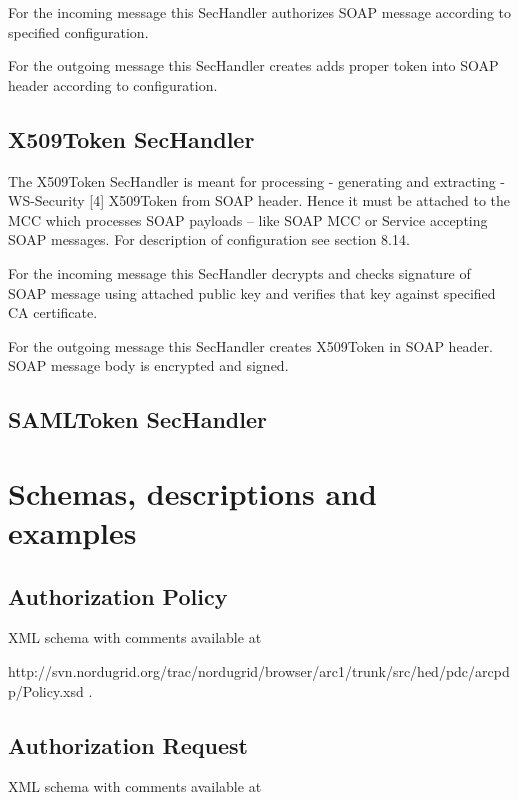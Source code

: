 \documentclass{article}                            %
\begin{document}
For the incoming message this SecHandler authorizes SOAP message according to specified configuration.

For the outgoing message this SecHandler creates adds proper token into SOAP header according to configuration.

\subsection{X509Token SecHandler} %
\label{subsec:x509_token}
The X509Token SecHandler is meant for processing - generating and extracting - WS-Security [4] X509Token from SOAP header. Hence it must be attached to the MCC which processes SOAP payloads – like SOAP MCC or Service accepting SOAP messages. For description of configuration see section 8.14.

For the incoming message this SecHandler decrypts and checks signature of SOAP message using attached public key and verifies that key against specified CA certificate.

For the outgoing message this SecHandler creates X509Token in SOAP header. SOAP message body is encrypted and signed.

\subsection{SAMLToken SecHandler} %
\label{subsec:saml_token}



\section{Schemas, descriptions and examples} %
\label{sec:schema_description_example}

\subsection{Authorization Policy} %
\label{subsec:authz_policy}
XML schema with comments available at

http://svn.nordugrid.org/trac/nordugrid/browser/arc1/trunk/src/hed/pdc/arcpdp/Policy.xsd .

\subsection{Authorization Request} %
\label{subsec:authz_request}
XML schema with comments available at 
\end{document}
